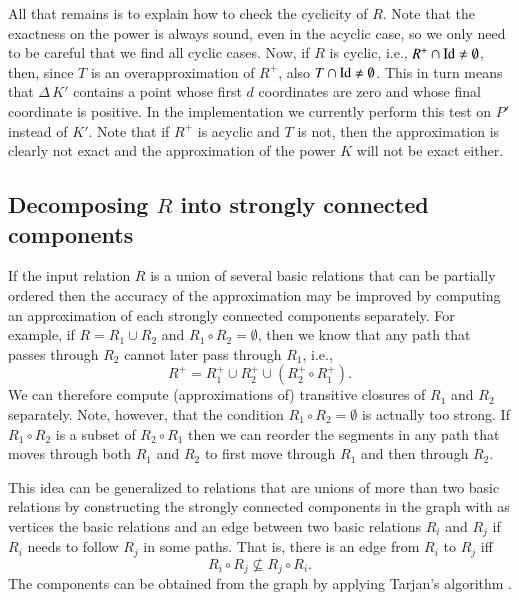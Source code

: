 All that remains is to explain how to check the cyclicity of $R$.
Note that the exactness on the power is always sound, even
in the acyclic case, so we only need to be careful that we find
all cyclic cases.  Now, if $R$ is cyclic, i.e.,
$R^+ \cap \mathop{\rm Id}\nolimits \ne \emptyset$, then, since $T$ is
an overapproximation of $R^+$, also
$T \cap \mathop{\rm Id}\nolimits \ne \emptyset$.  This in turn means
that $\Delta \, K'$ contains a point whose first $d$ coordinates
are zero and whose final coordinate is positive.
In the implementation we currently perform this test on $P'$ instead of $K'$.
Note that if $R^+$ is acyclic and $T$ is not, then the approximation
is clearly not exact and the approximation of the power $K$
will not be exact either.

\subsection{Decomposing $R$ into strongly connected components}

If the input relation $R$ is a union of several basic relations
that can be partially ordered
then the accuracy of the approximation may be improved by computing
an approximation of each strongly connected components separately.
For example, if $R = R_1 \cup R_2$ and $R_1 \circ R_2 = \emptyset$,
then we know that any path that passes through $R_2$ cannot later
pass through $R_1$, i.e.,
\begin{equation}
\label{eq:transitive:components}
R^+ = R_1^+ \cup R_2^+ \cup \left(R_2^+ \circ R_1^+\right)
.
\end{equation}
We can therefore compute (approximations of) transitive closures
of $R_1$ and $R_2$ separately.
Note, however, that the condition $R_1 \circ R_2 = \emptyset$
is actually too strong.
If $R_1 \circ R_2$ is a subset of $R_2 \circ R_1$
then we can reorder the segments
in any path that moves through both $R_1$ and $R_2$ to
first move through $R_1$ and then through $R_2$.

This idea can be generalized to relations that are unions
of more than two basic relations by constructing the
strongly connected components in the graph with as vertices
the basic relations and an edge between two basic relations
$R_i$ and $R_j$ if $R_i$ needs to follow $R_j$ in some paths.
That is, there is an edge from $R_i$ to $R_j$ iff
\begin{equation}
\label{eq:transitive:edge}
R_i \circ R_j
\not\subseteq
R_j \circ R_i
.
\end{equation}
The components can be obtained from the graph by applying
Tarjan's algorithm .

